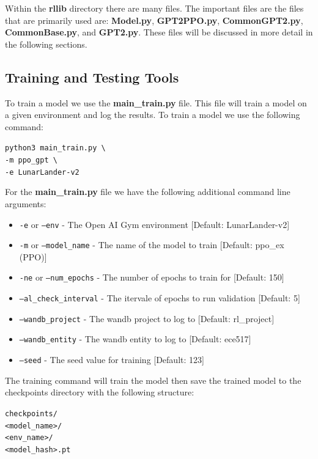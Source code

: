 Within the \textbf{rllib} directory there are many files. The important files are the files that are primarily used 
are: \textbf{Model.py}, \textbf{GPT2PPO.py}, \textbf{CommonGPT2.py}, \textbf{CommonBase.py}, and \textbf{GPT2.py}.
These files will be discussed in more detail in the following sections.

\subsection{Training and Testing Tools}
To train a model we use the \textbf{main\_train.py} file. This file will train a model on a given environment and log the results.
To train a model we use the following command:
\begin{center}
    \texttt{python3 main\_train.py \textbackslash \\}
    \texttt{-m ppo\_gpt \textbackslash \\}
    \texttt{-e LunarLander-v2}
\end{center}

For the \textbf{main\_train.py} file we have the following additional command line arguments:
\begin{itemize}
    \item \texttt{-e} or \texttt{--env} - The Open AI Gym environment [Default: LunarLander-v2]
    \item \texttt{-m} or \texttt{--model\_name} - The name of the model to train [Default: ppo\_ex (PPO)]
    \item \texttt{-ne} or \texttt{--num\_epochs} - The number of epochs to train for [Default: 150]
    \item \texttt{--al\_check\_interval} - The itervale of epochs to run validation [Default: 5]
    \item \texttt{--wandb\_project} - The wandb project to log to [Default: rl\_project]
    \item \texttt{--wandb\_entity} - The wandb entity to log to [Default: ece517]
    \item \texttt{--seed} - The seed value for training [Default: 123]
\end{itemize}

The training command will train the model then save the trained model to the checkpoints directory with the following structure:
\begin{center}
    \texttt{checkpoints/\\<model\_name>/\\<env\_name>/\\<model\_hash>.pt}
\end{center}

